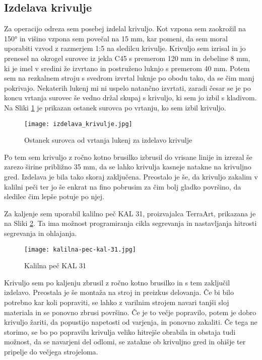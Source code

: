 \subsection{Izdelava krivulje}
Za operacijo odreza sem posebej izdelal krivuljo. Kot vzpona
sem zaokrožil na 150° in višino vzpona sem povečal na 15 mm,
kar pomeni, da sem moral uporabiti vzvod z razmerjem 1:5 na
sledilcu krivulje. Krivuljo sem izrisal in jo prenesel na
okrogel surovec iz jekla C45 s premerom 120 mm in debeline 8 mm, ki je imel
v sredini že izvrtano in postruženo luknjo s premerom 40 mm.
Potem sem na rezkalnem stroju s svedrom izvrtal luknje po obodu tako,
da se čim manj pokrivajo. Nekaterih lukenj mi ni uspelo natančno
izvrtati, zaradi česar se je po koncu vrtanja surovec še vedno držal skupaj
s krivuljo, ki sem jo izbil s kladivom. Na Sliki \ref{izdelava_krivulje}
je prikazan ostanek surovca po vrtanju, ko sem izbil krivuljo.

\begin{figure}[H]
	\begin{center}
		\texttt{[image: izdelava\_krivulje.jpg]}
		\caption{Ostanek surovca od vrtanja lukenj za izdelavo krivulje
			\cite{lasten}}
		\label{izdelava_krivulje}
	\end{center}
\end{figure}

Po tem sem krivuljo z ročno kotno brusilko izbrusil do vrisane linije
in izrezal še zarezo širine približno 35 mm, da se lahko krivulja
kasneje natakne na krivuljno gred. Izdelava je bila tako skoraj zaključena.
Preostalo je še, da  krivuljo zakalim v kalilni peči ter jo
še enkrat na fino pobrusim za čim bolj gladko površino,
da sledilec čim lepše potuje po njej.

Za kaljenje sem uporabil kalilno peč KAL 31, proizvajalca TerraArt,
prikazana je na Sliki \ref{kalilna_pec_slika}. Ta ima možnost programiranja
cikla segrevanja in nastavljanja hitrosti segrevanja in ohlajanja.

\begin{figure}[H]
	\begin{center}
		\texttt{[image: kalilna-pec-kal-31.jpg]}
		\caption{Kalilna peč KAL 31
			\cite{kalilna_pec}}
		\label{kalilna_pec_slika}
	\end{center}
\end{figure}

Krivuljo sem po kaljenju zbrusil z ročno kotno brusilko in s tem
zaključil izdelavo. Preostala je še montaža na stroj in preizkus
delovanja. Če bi bilo potrebno kar koli popraviti, se lahko z
varilnim strojem navari tanjši sloj materiala in se ponovno zbrusi
površino. Če je to večje popravilo, potem je dobro krivuljo
žariti, da popustijo napetosti od varjenja, in ponovno zakaliti.
Če tega ne storimo, se bo po popravilu krivulja veliko hitrejše
obrabila in obstaja tudi možnost, da se navarjeni del odlomi, se zatakne ob krivuljno gred in ohišje ter pripelje do večjega
strojeloma.
